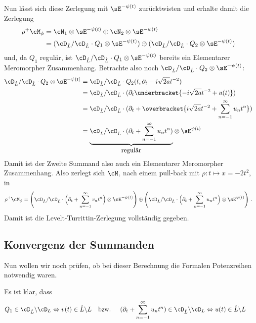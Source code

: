 Nun lässt sich diese Zerlegung mit $\sE^{-\psi(t)}$ zurücktwisten und erhalte
damit die Zerlegung
\begin{align*}
\rho^+\cM_{\phi} &=
  \cN_1\otimes\sE^{-\psi(t)}\oplus\cN_2\otimes\sE^{-\psi(t)}
\\&= (\cD_{\hat L}/\cD_{\hat L}\cdot Q_1\otimes\sE^{-\psi(t)})
  \oplus(\cD_{\hat L}/\cD_{\hat L}\cdot Q_2\otimes\sE^{-\psi(t)})
\end{align*}
und, da $Q_1$ regulär, ist $\cD_{\hat L}/\cD_{\hat L}\cdot
Q_1\otimes\sE^{-\psi(t)}$ bereits ein Elementarer Meromorpher Zusammenhang.
Betrachte also noch $\cD_{\hat L}/\cD_{\hat L}\cdot Q_2\otimes\sE^{-\psi(t)}$:
\begin{align*}
\cD_{\hat L}/\cD_{\hat L}\cdot Q_2\otimes\sE^{-\psi(t)}
  &= \cD_{\hat L}/\cD_{\hat L}\cdot Q_2(t,\partial_t-i\sqrt{2a}t^{-2})
\\&= \cD_{\hat L}/\cD_{\hat L}\cdot (\partial_t
  \underbracket{-i\sqrt{2a}t^{-2} + u(t)})
\\&= \cD_{\hat L}/\cD_{\hat L}\cdot (\partial_t + \overbracket{i\sqrt{2a}t^{-2}
  +\sum_{n=-1}^\infty u_nt^n})
\\&= \underset{\mbox{regulär}}{\underbrace{
  \cD_{\hat L}/\cD_{\hat L}\cdot (\partial_t
  + \sum_{n=-1}^\infty u_nt^n)}}\otimes\sE^{\psi(t)}
\end{align*}
Damit ist der Zweite Summand also auch ein Elementarer Meromorpher
Zusammenhang.
Also zerlegt sich $\cM$, nach einem pull-back mit $\rho:t\mapsto x=-2t^2$, in
\[
\rho^+\cM_{\phi} = \left(\cD_{\hat L}/\cD_{\hat L}\cdot \Big(\partial_t
  + \sum_{n=-1}^\infty v_nt^n\Big)\otimes\sE^{-\psi(t)}\right)
  \oplus \left(\cD_{\hat L}/\cD_{\hat L}\cdot \Big(\partial_t
  + \sum_{n=-1}^\infty u_nt^n\Big)\otimes\sE^{\psi(t)}\right) \,.
\]
Damit ist die Levelt-Turrittin-Zerlegung vollständig gegeben.

\subsection{Konvergenz der Summanden} \label{sec:konvergenzDerPotReihen}
Nun wollen wir noch prüfen, ob bei dieser Berechnung die Formalen Potenzreihen
notwendig waren.
\begin{comment}
TODO: text
\end{comment}
Es ist klar, dass 
\begin{align*}
Q_1\in\cD_{\hat L} \backslash\cD_L &\Leftrightarrow v(t) \in\hat L \backslash L
&\mbox{bzw. } & &
(\partial_t + \sum_{n=-1}^\infty u_nt^n)\in \cD_{\hat L} \backslash \cD_L
&\Leftrightarrow u(t) \in \hat L \backslash L
\end{align*}

